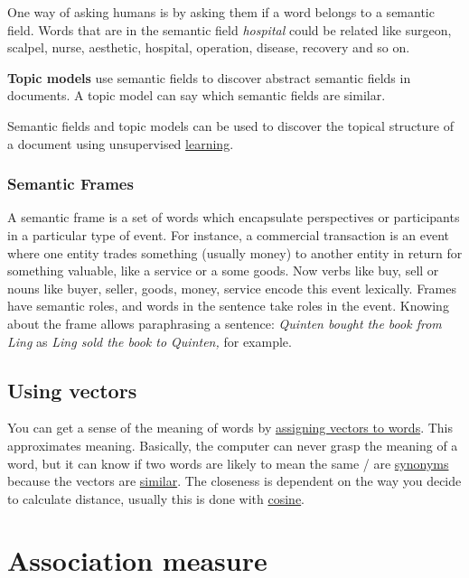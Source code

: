 \documentclass[
  11pt,
  british,
]{article}
\begin{document}
One way of asking humans is by asking them if a word belongs to a
semantic field. Words that are in the semantic field \emph{hospital}
could be related like surgeon, scalpel, nurse, aesthetic, hospital,
operation, disease, recovery and so on.

\textbf{Topic models} use semantic fields to discover abstract semantic
fields in documents. A topic model can say which semantic fields are
similar.

Semantic fields and topic models can be used to discover the topical
structure of a document using unsupervised
\href{../Other/Learning.md}{learning}.

\hypertarget{semantic-frames}{%
\subsubsection{Semantic Frames}\label{semantic-frames}}

A semantic frame is a set of words which encapsulate perspectives or
participants in a particular type of event. For instance, a commercial
transaction is an event where one entity trades something (usually
money) to another entity in return for something valuable, like a
service or a some goods. Now verbs like buy, sell or nouns like buyer,
seller, goods, money, service encode this event lexically. Frames have
semantic roles, and words in the sentence take roles in the event.
Knowing about the frame allows paraphrasing a sentence: \emph{Quinten
bought the book from Ling} as \emph{Ling sold the book to Quinten,} for
example.

\hypertarget{using-vectors}{%
\subsection{Using vectors}\label{using-vectors}}

You can get a sense of the meaning of words by
\href{Vector\%20semantics.md}{assigning vectors to words}. This
approximates meaning. Basically, the computer can never grasp the
meaning of a word, but it can know if two words are likely to mean the
same / are \href{../Languages/Synonyms.md}{synonyms} because the vectors
are \href{Similarity.md}{similar}. The closeness is dependent on the way
you decide to calculate distance, usually this is done with
\href{Cosine.md}{cosine}.

\hypertarget{association-measure-1}{%
\section{Association measure}\label{association-measure-1}}
\end{document}
